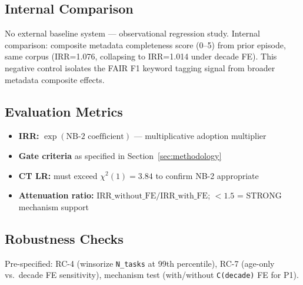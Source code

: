 \subsection{Internal Comparison}

No external baseline system --- observational regression study. Internal comparison: composite metadata completeness score (0--5) from prior episode, same corpus (IRR=1.076, collapsing to IRR=1.014 under decade FE). This negative control isolates the FAIR F1 keyword tagging signal from broader metadata composite effects.

\subsection{Evaluation Metrics}

\begin{itemize}
\item \textbf{IRR:} $\exp(\text{NB-2 coefficient})$ --- multiplicative adoption multiplier
\item \textbf{Gate criteria} as specified in Section~\ref{sec:methodology}
\item \textbf{CT LR:} must exceed $\chi^2(1)=3.84$ to confirm NB-2 appropriate
\item \textbf{Attenuation ratio:} $\text{IRR\_without\_FE} / \text{IRR\_with\_FE}$; $< 1.5$ = STRONG mechanism support
\end{itemize}

\subsection{Robustness Checks}

Pre-specified: RC-4 (winsorize \texttt{N\_tasks} at 99th percentile), RC-7 (age-only vs.\ decade FE sensitivity), mechanism test (with/without \texttt{C(decade)} FE for P1).
